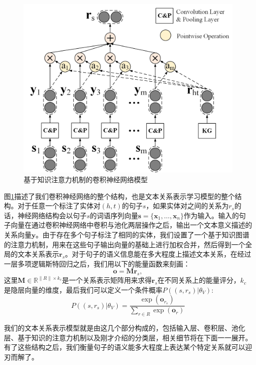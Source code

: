 \vspace{25pt}
\begin{figure}[h]
\setlength{\abovecaptionskip}{30pt} 
\centering
\includegraphics[width=0.9\columnwidth]{figures/ch3/cnn.jpg}
\caption{基于知识注意力机制的卷积神经网络模型}
\label{fig3:cnn}
\end{figure}

图\ref{fig3:cnn}描述了我们卷积神经网络的整个结构，也是文本关系表示学习模型的整个结构。对于任意一个标注了实体对$(h, t)$的句子$s$，如果实体对之间的关系为$r_s$的话，神经网络结构会以句子$s$的词语序列向量$\mathbf{s} = \{\mathbf{x}_1, \ldots, \mathbf{x}_n \}$作为输入。输入的句子向量在通过卷积神经网络中卷积与池化两层操作之后，输出一个文本意义描述的关系向量$\mathbf{y}$。由于存在多个句子标注了相同的实体，我们设置了一个基于知识图谱的注意力机制，用来在这些句子输出向量的基础上进行加权合并，然后得到一个全局的文本关系表示$\mathbf{r}_s$。对于句子的语义信息能在多大程度上描述文本关系，在经过一层多项逻辑斯特回归之后，我们用以下的能量函数来刻画：
\begin{equation}
\mathbf{o} = \mathbf{M}\mathbf{r}_s,
\label{eq3:cnn_distance}
\end{equation}
这里$\mathbf{M} \in \mathbb{R}^{\|R\| \times k_c} $是一个关系表示矩阵用来求得$\mathbf{r}_s$在不同关系上的能量评分，$k_c$是隐层向量的维度，最后我们可以定义一个条件概率$P((s, r_s)|{\theta_V})$:
\begin{equation}
P((s, r_s)|{\theta_V}) = \frac{\exp(\mathbf{o}_{r_s})}{\sum_{r \in R} \exp(\mathbf{o}_{r})}
\label{eq3:cnn_distance1}
\end{equation}

我们的文本关系表示模型就是由这几个部分构成的，包括输入层、卷积层、池化层、基于知识的注意力机制以及刚才介绍的分类层，相关细节将在下面一一展开。有了这些结构之后，我们衡量句子的语义能多大程度上表达某个特定关系就可以迎刃而解了。



